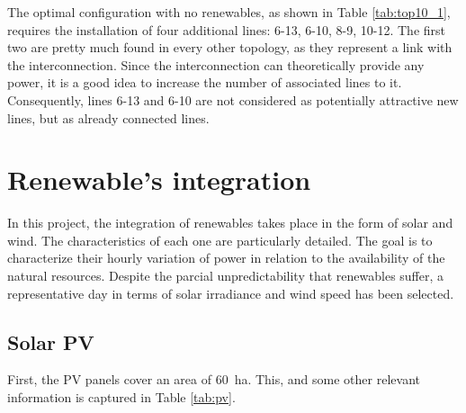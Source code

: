 The optimal configuration with no renewables, as shown in Table \ref{tab:top10_1}, requires the installation of four additional lines: 6-13, 6-10, 8-9, 10-12. The first two are pretty much found in every other topology, as they represent a link with the interconnection. Since the interconnection can theoretically provide any power, it is a good idea to increase the number of associated lines to it. Consequently, lines 6-13 and 6-10 are not considered as potentially attractive new lines, but as already connected lines.



\section{Renewable's integration}
In this project, the integration of renewables takes place in the form of solar and wind. The characteristics of each one are particularly detailed. The goal is to characterize their hourly variation of power in relation to the availability of the natural resources. Despite the parcial unpredictability that renewables suffer, a representative day in terms of solar irradiance and wind speed has been selected. 

\subsection{Solar PV}
First, the PV panels cover an area of 60~ha. This, and some other relevant information is captured in Table \ref{tab:pv}. 


